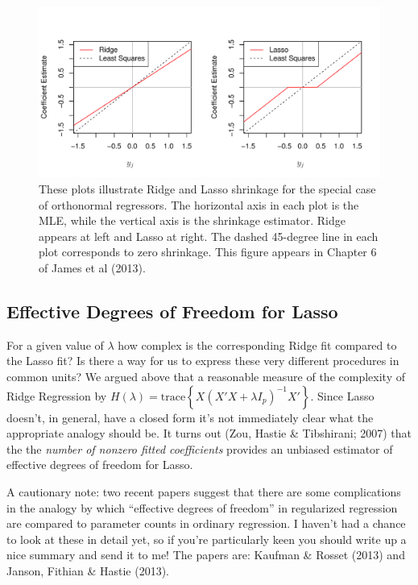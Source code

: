\documentclass[12pt]{article}
\theoremstyle{definition}
\begin{document}
\begin{figure}
	\centering
	\includegraphics[scale=0.7]{ISLR_ch6_fig10}
	\caption{These plots illustrate Ridge and Lasso shrinkage for the special case of orthonormal regressors. The horizontal axis in each plot is the MLE, while the vertical axis is the shrinkage estimator. Ridge appears at left and Lasso at right. The dashed 45-degree line in each plot corresponds to zero shrinkage. This figure appears in Chapter 6 of James et al (2013).}
	\label{fig:ridge_lasso_shrink}
\end{figure}

\subsection{Effective Degrees of Freedom for Lasso}
For a given value of $\lambda$ how complex is the corresponding Ridge fit compared to the Lasso fit? Is there a way for us to express these very different procedures in common units? We argued above that a reasonable measure of the complexity of Ridge Regression by $H(\lambda) = \mbox{trace}\left\{ X(X'X + \lambda I_p)^{-1} X'\right\}$. Since Lasso doesn't, in general, have a closed form it's not immediately clear what the appropriate analogy should be. It turns out (Zou, Hastie \& Tibshirani; 2007) that the the \emph{number of nonzero fitted coefficients} provides an unbiased estimator of effective degrees of freedom for Lasso. 

A cautionary note: two recent papers suggest that there are some complications in the analogy by which ``effective degrees of freedom'' in regularized regression are compared to parameter counts in ordinary regression. I haven't had a chance to look at these in detail yet, so if you're particularly keen you should write up a nice summary and send it to me! The papers are: Kaufman \& Rosset (2013) and Janson, Fithian \& Hastie (2013).
\end{document}
